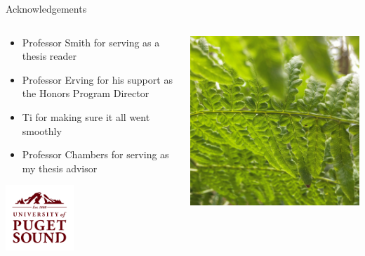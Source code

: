 \appendix

\begin{frame}{Acknowledgements}
\begin{columns}
\begin{column}{0.6\textwidth}
\begin{itemize}
\item Professor Smith for serving as a thesis reader
\item Professor Erving for his support as the Honors Program Director
\item Ti for making sure it all went smoothly
\item Professor Chambers for serving as my thesis advisor
\end{itemize}
	\vspace{-1ex}
	\begin{center}{
    \includegraphics[width= 0.4\textwidth]{img/UofPS_stacked_maroonRGB_PNG}}
    \end{center}

\end{column}
\begin{column}{0.4\textwidth}
\begin{center}
\includegraphics[width=\textwidth,trim={16cm 0 21cm 0},clip]{img/forest_fern}
\end{center}
\end{column}
\end{columns}

\end{frame}

